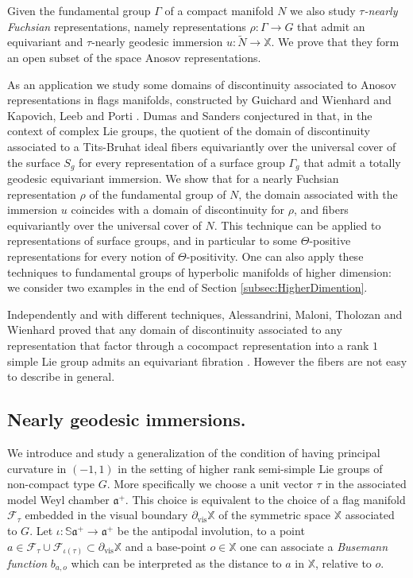 \documentclass[reqno,10pt]{amsart}
\theoremstyle{plain}
\theoremstyle{definition}
\theoremstyle{remark}
\newcommand{\type}{\tau}
\newcommand{\Sph}{\mathbb{S}}
\DeclareMathOperator{\vis}{vis}
\newcommand{\partialvis}{\partial_{\vis}}
\newcommand{\X}{\mathbb{X}}
\begin{document}
Given the fundamental group $\Gamma$ of a compact manifold $N$ we also study \emph{$\type$-nearly Fuchsian} representations, namely representations $\rho:\Gamma\to G$ that admit an equivariant and $\type$-nearly geodesic immersion $u:\widetilde{N}\to \X$. We prove that they form an open subset of the space Anosov representations.

\medskip

As an application we study some domains of discontinuity associated to Anosov representations in flags manifolds, constructed by Guichard and Wienhard \cite{GWDod} and Kapovich, Leeb and Porti \cite{KLP-DoD}. Dumas and Sanders conjectured in \cite{DumasSanders} that, in the context of complex Lie groups, the quotient of the domain of discontinuity associated to a Tits-Bruhat ideal fibers equivariantly over the universal cover of the surface $S_g$ for every representation of a surface group $\Gamma_g$ that admit a totally geodesic equivariant immersion. 
We show that for a nearly Fuchsian representation $\rho$ of the fundamental group of $N$, the domain associated with the immersion $u$ coincides with a domain of discontinuity for $\rho$, and fibers equivariantly over the universal cover of $N$. This technique can be applied to representations of surface groups, and in particular to some $\Theta$-positive representations for every notion of $\Theta$-positivity. One can also apply these techniques to fundamental groups of hyperbolic manifolds of higher dimension: we consider two examples in the end of Section \ref{subsec:HigherDimention}.

\medskip

Independently and with different techniques, Alessandrini, Maloni, Tholozan and Wienhard proved that any domain of discontinuity associated to any representation that factor through a cocompact representation into a rank $1$ simple Lie group admits an equivariant fibration \cite{AMTW}. However the fibers are not easy to describe in general.

\subsection{Nearly geodesic immersions.}

We introduce and study a generalization of the condition of having principal curvature in $(-1,1)$ in the setting of higher rank semi-simple Lie groups of non-compact type $G$. More specifically we choose a unit vector $\tau$ in the associated model Weyl chamber $\mathfrak{a}^+$. This choice is equivalent to the choice of a flag manifold $\mathcal{F}_\type$ embedded in the visual boundary $\partialvis \X$ of the symmetric space $\X$ associated to $G$. Let $\iota:\Sph\mathfrak{a}^+\to \mathfrak{a}^+$ be the antipodal involution, to a point $a\in \mathcal{F}_\type\cup \mathcal{F}_{\iota(\type)}\subset \partialvis \X$ and a base-point $o\in \X$ one can associate a \emph{Busemann function} $b_{a,o}$ which can be interpreted as the distance to $a$ in $\X$, relative to $o$. 
\end{document}
